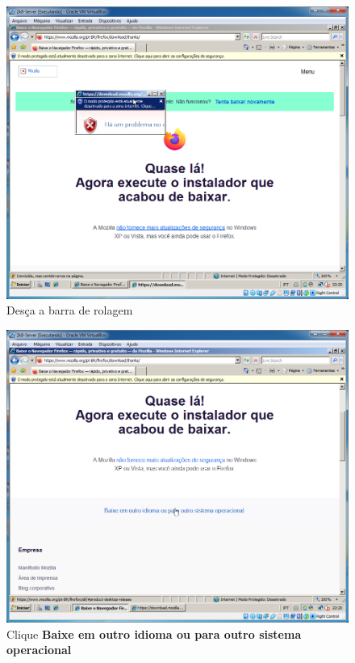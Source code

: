 \documentclass[10pt]{article}
\begin{document}
\begin{figure}[H]
    \centering
    \caption{Desça a barra de rolagem}
    \label{fig:re053}
    \includegraphics[width=\linewidth]{images/rede_externa/re053.png}
\end{figure}
\begin{figure}[H]
    \centering
    \caption{Clique \textbf{Baixe em outro idioma ou para outro sistema operacional}}
    \label{fig:re054}
    \includegraphics[width=\linewidth]{images/rede_externa/re054.png}
\end{figure}
\end{document}
